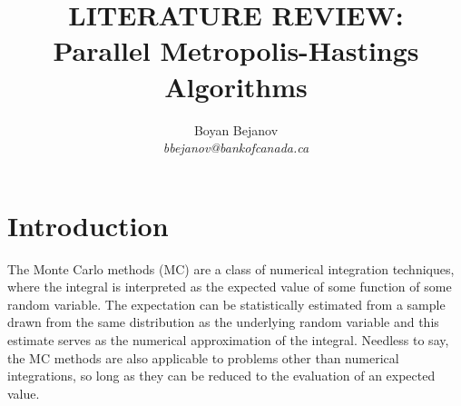 \documentclass[11pt]{article}       %
\begin{document}


\title{LITERATURE REVIEW: \\
  Parallel Metropolis-Hastings Algorithms
}


\author{
Boyan Bejanov\\
{\em bbejanov@bankofcanada.ca}
} %

\maketitle



\section{Introduction} \label{intro}

The Monte Carlo methods (MC) are a class of numerical integration techniques,
where the integral is interpreted as the expected value of some function of
some random variable.  The expectation can be statistically estimated from a
sample drawn from the same distribution as the underlying random variable and
this estimate serves as the numerical approximation of the integral.  Needless
to say, the MC methods are also applicable to problems other than numerical
integrations, so long as they can be reduced to the evaluation of an expected
value.  
\end{document}
